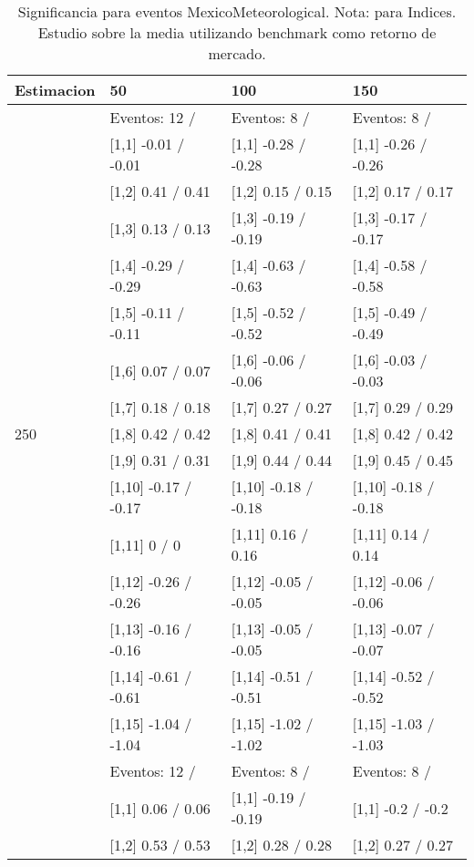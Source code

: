 \begin{table}

\caption{Significancia para eventos MexicoMeteorological. Nota: para Indices. Estudio sobre la media utilizando benchmark como retorno de mercado.}
\centering
\begin{tabular}[t]{llll}
\toprule
Estimacion & 50 & 100 & 150\\
\midrule
 & Eventos:  12 / & Eventos:  8 / & Eventos:  8 /\\
 & {}[1,1] -0.01  / -0.01 & {}[1,1] -0.28  / -0.28 & {}[1,1] -0.26  / -0.26\\
 & {}[1,2] 0.41  / 0.41 & {}[1,2] 0.15  / 0.15 & {}[1,2] 0.17  / 0.17\\
 & {}[1,3] 0.13  / 0.13 & {}[1,3] -0.19  / -0.19 & {}[1,3] -0.17  / -0.17\\
 & {}[1,4] -0.29  / -0.29 & {}[1,4] -0.63  / -0.63 & {}[1,4] -0.58  / -0.58\\
\addlinespace
 & {}[1,5] -0.11  / -0.11 & {}[1,5] -0.52  / -0.52 & {}[1,5] -0.49  / -0.49\\
 & {}[1,6] 0.07  / 0.07 & {}[1,6] -0.06  / -0.06 & {}[1,6] -0.03  / -0.03\\
 & {}[1,7] 0.18  / 0.18 & {}[1,7] 0.27  / 0.27 & {}[1,7] 0.29  / 0.29\\
250 & {}[1,8] 0.42  / 0.42 & {}[1,8] 0.41  / 0.41 & {}[1,8] 0.42  / 0.42\\
 & {}[1,9] 0.31  / 0.31 & {}[1,9] 0.44  / 0.44 & {}[1,9] 0.45  / 0.45\\
\addlinespace
 & {}[1,10] -0.17  / -0.17 & {}[1,10] -0.18  / -0.18 & {}[1,10] -0.18  / -0.18\\
 & {}[1,11] 0  / 0 & {}[1,11] 0.16  / 0.16 & {}[1,11] 0.14  / 0.14\\
 & {}[1,12] -0.26  / -0.26 & {}[1,12] -0.05  / -0.05 & {}[1,12] -0.06  / -0.06\\
 & {}[1,13] -0.16  / -0.16 & {}[1,13] -0.05  / -0.05 & {}[1,13] -0.07  / -0.07\\
 & {}[1,14] -0.61  / -0.61 & {}[1,14] -0.51  / -0.51 & {}[1,14] -0.52  / -0.52\\
\addlinespace
 & {}[1,15] -1.04  / -1.04 & {}[1,15] -1.02  / -1.02 & {}[1,15] -1.03  / -1.03\\
 & Eventos:  12 / & Eventos:  8 / & Eventos:  8 /\\
 & {}[1,1] 0.06  / 0.06 & {}[1,1] -0.19  / -0.19 & {}[1,1] -0.2  / -0.2\\
 & {}[1,2] 0.53  / 0.53 & {}[1,2] 0.28  / 0.28 & {}[1,2] 0.27  / 0.27\\

\end{tabular}
\end{table}
